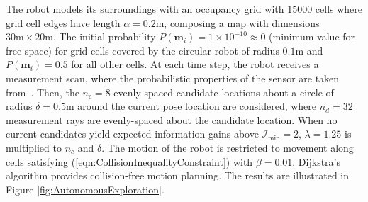 \documentclass[letterpaper, 10pt, conference]{ieeeconf}
\newcommand{\refeqn}[1]{(\ref{eqn:#1})}
\begin{document}
The robot models its surroundings with an occupancy grid with $15000$ cells where grid cell edges have length $\alpha=0.2$m, composing a map with dimensions $30\text{m}\times20\text{m}$. The initial probability $P(\mathbf{m}_i)=1\times10^{-10}\approx0$ (minimum value for free space) for grid cells covered by the circular robot of radius $0.1$m and $P(\mathbf{m}_i)=0.5$ for all other cells.
At each time step, the robot receives a measurement scan, where the probabilistic properties of the sensor are taken from~\cite{PirRutBisSch11,KhoElb12}. Then, the $n_c=8$ evenly-spaced candidate locations about a circle of radius $\delta=0.5$m around the current pose location are considered, where $n_d=32$ measurement rays are evenly-spaced about the candidate location.  When no current candidates yield expected information gains above $\mathcal I_\text{min}=2$, $\lambda=1.25$ is multiplied to $n_c$ and $\delta$. The motion of the robot is restricted to movement along cells satisfying \refeqn{CollisionInequalityConstraint} with $\beta=0.01$. Dijkstra's algorithm provides collision-free motion planning. %
The results are illustrated in Figure \ref{fig:AutonomousExploration}.
\end{document}
